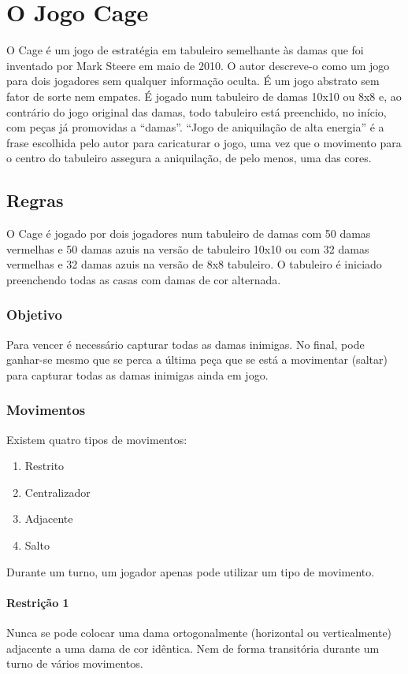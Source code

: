\documentclass[a4paper]{article}
\begin{document}
\section{O Jogo Cage}
O Cage é um jogo de estratégia em tabuleiro semelhante às damas que foi inventado por Mark Steere em maio de 2010. O autor descreve-o como um jogo para dois jogadores sem qualquer informação oculta. É um jogo abstrato sem fator de sorte nem empates. É jogado num tabuleiro de damas 10x10 ou 8x8 e, ao contrário do jogo original das damas, todo tabuleiro está preenchido, no início, com peças já promovidas a ``damas''. ``Jogo de aniquilação de alta energia'' é a frase escolhida pelo autor para caricaturar o jogo, uma vez que o movimento para o centro do tabuleiro assegura a aniquilação, de pelo menos, uma das cores.

\subsection{Regras}
O Cage é jogado por dois jogadores num tabuleiro de damas com 50 damas vermelhas e 50 damas azuis na versão de tabuleiro 10x10 ou com 32 damas vermelhas e 32 damas azuis na versão de 8x8 tabuleiro. O tabuleiro é iniciado preenchendo todas as casas com damas de cor alternada.

\subsubsection{Objetivo}
Para vencer é necessário capturar todas as damas inimigas. No final, pode ganhar-se mesmo que se perca a última peça que se está a movimentar (saltar) para capturar todas as damas inimigas ainda em jogo.

\subsubsection{Movimentos}
Existem quatro tipos de movimentos:
\begin{enumerate}
  \item Restrito
  \item Centralizador
  \item Adjacente
  \item Salto
\end{enumerate}
Durante um turno, um jogador apenas pode utilizar um tipo de movimento.

\paragraph{Restrição 1}
Nunca se pode colocar uma dama ortogonalmente (horizontal ou verticalmente) adjacente a uma dama de cor idêntica. Nem de forma transitória durante um turno de vários movimentos.
\end{document}
